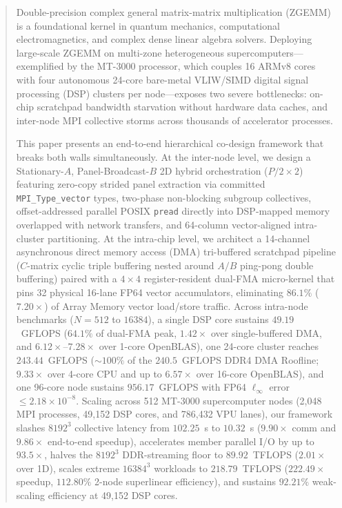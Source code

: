 \documentclass[conference]{IEEEtran}
\begin{document}
\begin{abstract}
Double-precision complex general matrix-matrix multiplication (ZGEMM) is a foundational kernel in quantum mechanics, computational electromagnetics, and complex dense linear algebra solvers. Deploying large-scale ZGEMM on multi-zone heterogeneous supercomputers---exemplified by the MT-3000 processor, which couples 16 ARMv8 cores with four autonomous 24-core bare-metal VLIW/SIMD digital signal processing (DSP) clusters per node---exposes two severe bottlenecks: on-chip scratchpad bandwidth starvation without hardware data caches, and inter-node MPI collective storms across thousands of accelerator processes.

This paper presents an end-to-end hierarchical co-design framework that breaks both walls simultaneously. At the inter-node level, we design a Stationary-$A$, Panel-Broadcast-$B$ 2D hybrid orchestration ($P/2 \times 2$) featuring zero-copy strided panel extraction via committed \texttt{MPI\_Type\_vector} types, two-phase non-blocking subgroup collectives, offset-addressed parallel POSIX \texttt{pread} directly into DSP-mapped memory overlapped with network transfers, and 64-column vector-aligned intra-cluster partitioning. At the intra-chip level, we architect a 14-channel asynchronous direct memory access (DMA) tri-buffered scratchpad pipeline ($C$-matrix cyclic triple buffering nested around $A/B$ ping-pong double buffering) paired with a $4 \times 4$ register-resident dual-FMA micro-kernel that pins 32 physical 16-lane FP64 vector accumulators, eliminating $86.1\%$ ($7.20\times$) of Array Memory vector load/store traffic. Across intra-node benchmarks ($N=512$ to $16384$), a single DSP core sustains $49.19$~GFLOPS ($64.1\%$ of dual-FMA peak, $1.42\times$ over single-buffered DMA, and $6.12\times$--$7.28\times$ over 1-core OpenBLAS), one 24-core cluster reaches $243.44$~GFLOPS ($\sim\!100\%$ of the $240.5$~GFLOPS DDR4 DMA Roofline; $9.33\times$ over 4-core CPU and up to $6.57\times$ over 16-core OpenBLAS), and one 96-core node sustains $956.17$~GFLOPS with FP64 $\ell_\infty$ error $\le 2.18 \times 10^{-8}$. Scaling across 512 MT-3000 supercomputer nodes (2,048 MPI processes, 49,152 DSP cores, and 786,432 VPU lanes), our framework slashes $8192^3$ collective latency from $102.25$~s to $10.32$~s ($9.90\times$ comm and $9.86\times$ end-to-end speedup), accelerates member parallel I/O by up to $93.5\times$, halves the $8192^3$ DDR-streaming floor to $89.92$~TFLOPS ($2.01\times$ over 1D), scales extreme $16384^3$ workloads to $218.79$~TFLOPS ($222.49\times$ speedup, $112.80\%$ 2-node superlinear efficiency), and sustains $92.21\%$ weak-scaling efficiency at 49,152 DSP cores.
\end{abstract}
\end{document}
